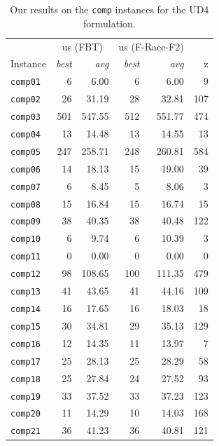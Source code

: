\documentclass[authoryear,12pt]{article}
\begin{document}
      \begin{table}[htdp]
    \begin{scriptsize}
    \caption{Our results on the  \texttt{comp} instances for the UD4 formulation.}
     \label{tab:results-UD4}
    \begin{center}
    \begin{tabular}{l|rr|rr|r}
  \toprule
                 & \multicolumn{2}{c|}{us (FBT)}   & \multicolumn{2}{c|}{us (F-Race-F2)}   & \multicolumn{1}{c}{\citet{MSTIS13}}    \\
 Instance &  \emph{best} & \emph{avg} & \emph{best} & \emph{avg} & z \\
  \midrule
\texttt{comp01} & 6 & 6.00 & 6 & 6.00 & 9 \\
\texttt{comp02} & 26 & 31.19 & 28 & 32.81 & 107 \\
\texttt{comp03} & 501 & 547.55 & 512 & 551.77 & 474 \\
\texttt{comp04} & 13 & 14.48 & 13 & 14.55 & 13 \\
\texttt{comp05} & 247 & 258.71 & 248 & 260.81 & 584 \\
\texttt{comp06} & 14 & 18.13 & 15 & 19.00 & 39 \\
\texttt{comp07} & 6 & 8.45 & 5 & 8.06 & 3 \\
\texttt{comp08} & 15 & 16.84 & 15 & 16.74 & 15 \\
\texttt{comp09} & 38 & 40.35 & 38 & 40.48 & 122 \\
\texttt{comp10} & 6 & 9.74 & 6 & 10.39 & 3 \\
\texttt{comp11} & 0 & 0.00 & 0 & 0.00 & 0 \\
\texttt{comp12} & 98 & 108.65 & 100 & 111.35 & 479 \\
\texttt{comp13} & 41 & 43.65 & 41 & 44.16 & 109 \\
\texttt{comp14} & 16 & 17.65 & 16 & 18.03 & 18 \\
\texttt{comp15} & 30 & 34.81 & 29 & 35.13 & 129 \\
\texttt{comp16} & 12 & 14.35 & 11 & 13.97 & 7 \\
\texttt{comp17} & 25 & 28.13 & 25 & 28.29 & 58 \\
\texttt{comp18} & 25 & 27.84 & 24 & 27.52 & 93 \\
\texttt{comp19} & 33 & 37.52 & 33 & 37.23 & 123 \\
\texttt{comp20} & 11 & 14.29 & 10 & 14.03 & 168 \\
\texttt{comp21} & 36 & 41.23 & 36 & 40.81 & 121 \\
\bottomrule
   \end{tabular}
    \end{center}
    \end{scriptsize}
    \end{table}%
\end{document}
